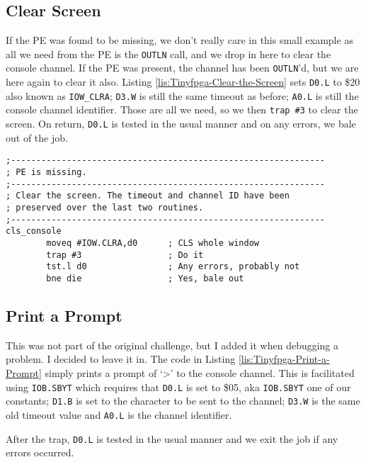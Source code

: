 \subsection{Clear Screen}

If the PE was found to be missing, we don't really care in this small
example as all we need from the PE is the \texttt{OUTLN} call, and
we drop in here to clear the console channel. If the PE was present,
the channel has been \texttt{OUTLN}'d, but we are here again to clear
it also. Listing \ref{lis:Tinyfpga-Clear-the-Screen} sets \texttt{D0.L}
to \$20 also known as \texttt{IOW\_CLRA}; \texttt{D3.W} is still the
same timeout as before; \texttt{A0.L} is still the console channel
identifier. Those are all we need, so we then \texttt{trap \#3} to
clear the screen. On return, \texttt{D0.L} is tested in the usual
manner and on any errors, we bale out of the job.

\begin{lstlisting}[caption={Tinyfpga - Clear the Screen},label={lis:Tinyfpga-Clear-the-Screen}]
;--------------------------------------------------------------
; PE is missing.
;--------------------------------------------------------------
; Clear the screen. The timeout and channel ID have been 
; preserved over the last two routines.
;--------------------------------------------------------------
cls_console
        moveq #IOW.CLRA,d0      ; CLS whole window
        trap #3                 ; Do it
        tst.l d0                ; Any errors, probably not
        bne die                 ; Yes, bale out

\end{lstlisting}


\subsection{Print a Prompt}

This was not part of the original challenge, but I added it when debugging
a problem. I decided to leave it in. The code in Listing \ref{lis:Tinyfpga-Print-a-Prompt}
simply prints a prompt of `>' to the console channel. This is facilitated
using \texttt{IOB.SBYT} which requires that \texttt{D0.L} is set to
\$05, aka \texttt{IOB.SBYT} one of our constants; \texttt{D1.B} is
set to the character to be sent to the channel; \texttt{D3.W} is the
same old timeout value and \texttt{A0.L} is the channel identifier.

After the trap, \texttt{D0.L} is tested in the usual manner and we
exit the job if any errors occurred.

